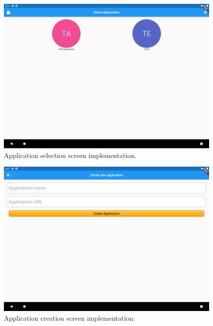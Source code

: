 \begin{figure}[H]
    \includegraphics[width=\textwidth]{Sprint_1/images/app_selection_screen_app.png}
    \caption{Application selection screen implementation.}
    \label{app_selection_screen_app}
\end{figure}

\begin{figure}[H]
    \includegraphics[width=\textwidth]{Sprint_1/images/create_app_screen_app.png}
    \caption{Application creation screen implementation.}
    \label{app_creation_screen_app}
\end{figure}

